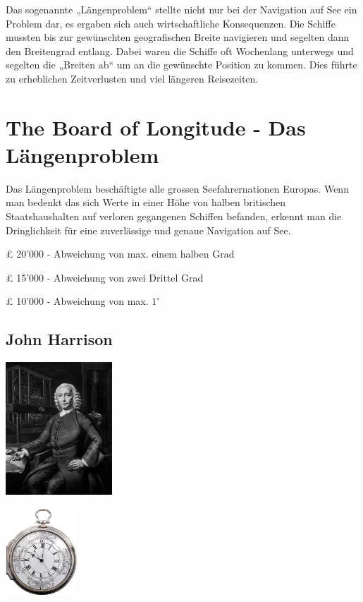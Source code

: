 \begin{refsection}
Das sogenannte „Längenproblem“ stellte nicht nur bei der Navigation auf See ein Problem dar, es ergaben sich auch wirtschaftliche Konsequenzen. Die Schiffe mussten bis zur gewünschten geografischen Breite navigieren und segelten dann den Breitengrad entlang. Dabei waren die Schiffe oft Wochenlang unterwegs und segelten die „Breiten ab“ um an die gewünschte Position zu kommen. Dies führte zu erheblichen Zeitverlusten und viel längeren Reisezeiten.


\section{The Board of Longitude - Das Längenproblem}
Das Längenproblem beschäftigte alle grossen Seefahrernationen Europas. Wenn man bedenkt das sich Werte in einer  Höhe von halben britischen Staatshaushalten auf verloren gegangenen Schiffen befanden, erkennt man die Dringlichkeit für eine zuverlässige und genaue Navigation auf See.\\


\begin{compactitem}
\item £ 20’000 - Abweichung von max. einem halben Grad
\item £ 15’000 - Abweichung von zwei Drittel Grad
\item £ 10’000 - Abweichung von max. $1 ^{\circ}$
\end{compactitem}

\subsection{John Harrison}

\begin{center}
        \includegraphics[width=0.3\textwidth]{kugel/JohnHarrison.jpg}
\end{center}





\begin{center}
        \includegraphics[width=0.2\textwidth]{kugel/HarrisonH4.jpg}
\end{center}



\end{refsection}
